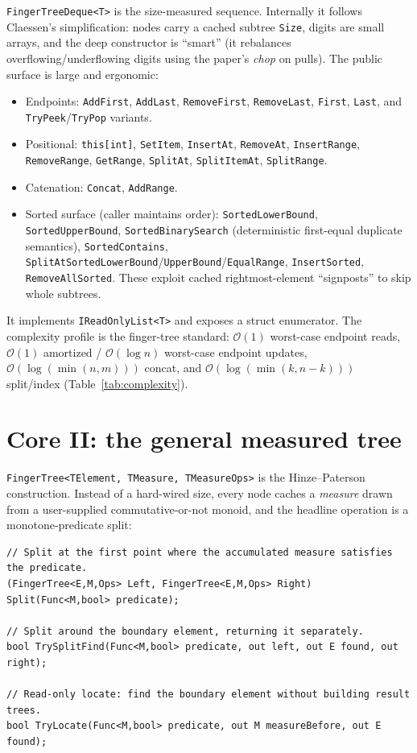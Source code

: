 \documentclass[11pt]{article}
\newcommand{\cs}[1]{\lstinline|#1|}
\newcommand{\bigO}{\ensuremath{\mathcal{O}}}
\begin{document}
\cs{FingerTreeDeque<T>} is the size-measured sequence. Internally it follows Claessen's simplification:
nodes carry a cached subtree \cs{Size}, digits are small arrays, and the deep constructor is ``smart''
(it rebalances overflowing/underflowing digits using the paper's \emph{chop} on pulls). The public
surface is large and ergonomic:

\begin{itemize}[leftmargin=1.4em, itemsep=1pt]
  \item Endpoints: \cs{AddFirst}, \cs{AddLast}, \cs{RemoveFirst}, \cs{RemoveLast}, \cs{First}, \cs{Last},
    and \cs{TryPeek}/\cs{TryPop} variants.
  \item Positional: \cs{this[int]}, \cs{SetItem}, \cs{InsertAt}, \cs{RemoveAt}, \cs{InsertRange},
    \cs{RemoveRange}, \cs{GetRange}, \cs{SplitAt}, \cs{SplitItemAt}, \cs{SplitRange}.
  \item Catenation: \cs{Concat}, \cs{AddRange}.
  \item Sorted surface (caller maintains order): \cs{SortedLowerBound}, \cs{SortedUpperBound},
    \cs{SortedBinarySearch} (deterministic first-equal duplicate semantics), \cs{SortedContains},
    \cs{SplitAtSortedLowerBound}/\cs{UpperBound}/\cs{EqualRange}, \cs{InsertSorted},
    \cs{RemoveAllSorted}. These exploit cached rightmost-element ``signposts'' to skip whole subtrees.
\end{itemize}

It implements \cs{IReadOnlyList<T>} and exposes a struct enumerator. The complexity profile is the
finger-tree standard: $\bigO(1)$ worst-case endpoint reads, $\bigO(1)$ amortized / $\bigO(\log n)$
worst-case endpoint updates, $\bigO(\log(\min(n,m)))$ concat, and $\bigO(\log(\min(k, n-k)))$
split/index (Table~\ref{tab:complexity}).

\section{Core II: the general measured tree}
\label{sec:measured}

\cs{FingerTree<TElement, TMeasure, TMeasureOps>} is the Hinze--Paterson construction. Instead of a
hard-wired size, every node caches a \emph{measure} drawn from a user-supplied commutative-or-not
monoid, and the headline operation is a monotone-predicate split:

\begin{lstlisting}
// Split at the first point where the accumulated measure satisfies the predicate.
(FingerTree<E,M,Ops> Left, FingerTree<E,M,Ops> Right) Split(Func<M,bool> predicate);

// Split around the boundary element, returning it separately.
bool TrySplitFind(Func<M,bool> predicate, out left, out E found, out right);

// Read-only locate: find the boundary element without building result trees.
bool TryLocate(Func<M,bool> predicate, out M measureBefore, out E found);
\end{lstlisting}
\end{document}
